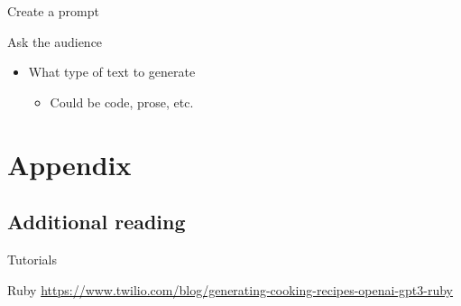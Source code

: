 \documentclass[presentation]{beamer}
\begin{document}
\begin{frame}[label={sec:org24ecd2c}]{Create a prompt}
\begin{block}{Ask the audience}
\begin{itemize}
\item What type of text to generate
\begin{itemize}
\item Could be code, prose, etc.
\end{itemize}
\end{itemize}
\end{block}
\end{frame}

\section{Appendix}
\label{sec:org70081b6}
\subsection{Additional reading}
\label{sec:org7f4f637}
\begin{frame}[label={sec:org73c387b}]{Tutorials}
\begin{block}{Ruby}
{\footnotesize
\url{https://www.twilio.com/blog/generating-cooking-recipes-openai-gpt3-ruby}
}
\end{block}
\end{frame}
\end{document}
